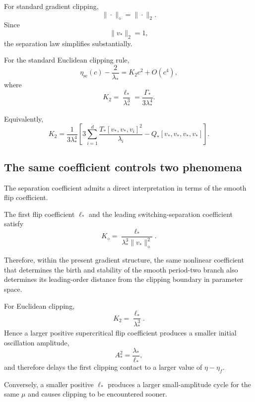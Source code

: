 For standard gradient clipping,
\[
\|\cdot\|_\diamond=\|\cdot\|_2.
\]
Since
\[
\|v_*\|_2=1,
\]
the separation law simplifies substantially.

\begin{corollary}
\label{cor:euclidean-separation}
For the standard Euclidean clipping rule,
\begin{equation}
\boxed{
\eta_{\mathrm{sc}}(c)
-
\frac{2}{\lambda_*}
=
K_2c^2
+
O(c^4),
}
\label{eq:euclidean-main-law}
\end{equation}
where
\begin{equation}
\boxed{
K_2
=
\frac{\ell_*}{\lambda_*^3}
=
\frac{\Gamma_*}{3\lambda_*^4}.
}
\label{eq:K-euclidean}
\end{equation}

Equivalently,
\begin{equation}
\boxed{
K_2
=
\frac{1}{3\lambda_*^4}
\left[
3
\sum_{i=1}^d
\frac{
T_*[v_*,v_*,v_i]^2
}{
\lambda_i
}
-
Q_*[v_*,v_*,v_*,v_*]
\right].
}
\label{eq:K-euclidean-expanded}
\end{equation}
\end{corollary}

\subsection{The same coefficient controls two phenomena}
\label{subsec:coefficient-duality}

The separation coefficient admits a direct interpretation in terms
of the smooth flip coefficient.

\begin{corollary}
\label{cor:flip-switching-relation}
The first flip coefficient $\ell_*$ and the leading
switching-separation coefficient satisfy
\begin{equation}
\boxed{
K_\diamond
=
\frac{\ell_*}{
\lambda_*^3
\|v_*\|_\diamond^2
}.
}
\label{eq:flip-switching-coefficient}
\end{equation}

Therefore, within the present gradient structure, the same nonlinear
coefficient that determines the birth and stability of the smooth
period-two branch also determines its leading-order distance from
the clipping boundary in parameter space.
\end{corollary}

\begin{remark}
\label{rem:coefficient-duality-euclidean}
For Euclidean clipping,
\[
K_2
=
\frac{\ell_*}{\lambda_*^3}.
\]
Hence a larger positive supercritical flip coefficient produces a
smaller initial oscillation amplitude,
\[
A_*^2=\frac{\lambda_*}{\ell_*},
\]
and therefore delays the first clipping contact to a larger value of
$\eta-\eta_f$.

Conversely, a smaller positive $\ell_*$ produces a larger
small-amplitude cycle for the same $\mu$ and causes clipping to be
encountered sooner.
\end{remark}

